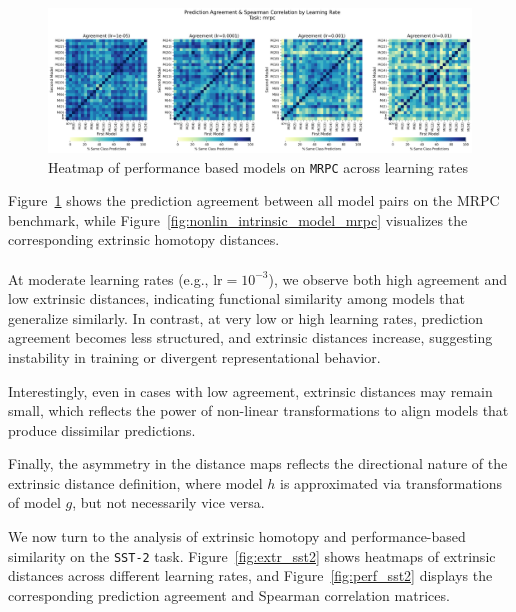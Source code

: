 \begin{figure}[H]
    \centering
    \includegraphics[width=\linewidth]{Abschlussarbeit/Pictures/PredictionAgreement_Spearman/_3Relu_final_training_HeatMap_mrpc_subplots_per_lr_4.png}
    \caption{Heatmap of performance based models on \texttt{MRPC} across learning rates}
    \label{fig:nonlin_performance_model_mrpc}
\end{figure}
Figure~\ref{fig:nonlin_performance_model_mrpc} shows the prediction agreement between all model pairs on the MRPC benchmark, while Figure~\ref{fig:nonlin_intrinsic_model_mrpc} visualizes the corresponding extrinsic homotopy distances.\\
\\
At moderate learning rates (e.g., \( \text{lr} = 10^{-3} \)), we observe both high agreement and low extrinsic distances, indicating functional similarity among models that generalize similarly.  
In contrast, at very low or high learning rates, prediction agreement becomes less structured, and extrinsic distances increase, suggesting instability in training or divergent representational behavior.

Interestingly, even in cases with low agreement, extrinsic distances may remain small, which reflects the power of non-linear transformations to align models that produce dissimilar predictions.

Finally, the asymmetry in the distance maps reflects the directional nature of the extrinsic distance definition, where model \( h \) is approximated via transformations of model \( g \), but not necessarily vice versa.

We now turn to the analysis of extrinsic homotopy and performance-based similarity on the \texttt{SST-2} task. 
Figure~\ref{fig:extr_sst2} shows heatmaps of extrinsic distances across different learning rates, and Figure~\ref{fig:perf_sst2} displays the corresponding prediction agreement and Spearman correlation matrices.

